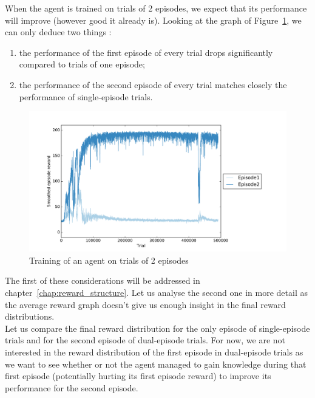 When the agent is trained on trials of 2 episodes, we expect that its
performance will improve (however good it already is). Looking at the graph 
of Figure~\ref{fig:20perms2ep_training}, we can only deduce two things : 
\begin{enumerate}
	\item the performance of the first episode of every trial drops 
		significantly compared to trials of one episode;
	\item the performance of the second episode of every trial matches
		closely the performance of single-episode trials.
\end{enumerate}

\begin{figure}[H]
	\centering
	\includegraphics[width=0.9\linewidth]{fig/20perms2ep_training.pdf}
	\caption{Training of an agent on trials of 2 episodes}
	\label{fig:20perms2ep_training}
\end{figure}

The first of these considerations will be addressed in
chapter~\ref{chap:reward_structure}. Let us analyse the second one in more detail
as the average reward graph doesn't give us enough insight in the final
reward distributions.\\


Let us compare the final reward distribution for the only episode of 
single-episode trials and for the second episode of dual-episode trials.
For now, we are not interested in the reward distribution of the first episode
in dual-episode trials as we want to see whether or not the agent managed to
gain knowledge during that first episode (potentially hurting its first episode
reward) to improve its performance for the second episode.\\

